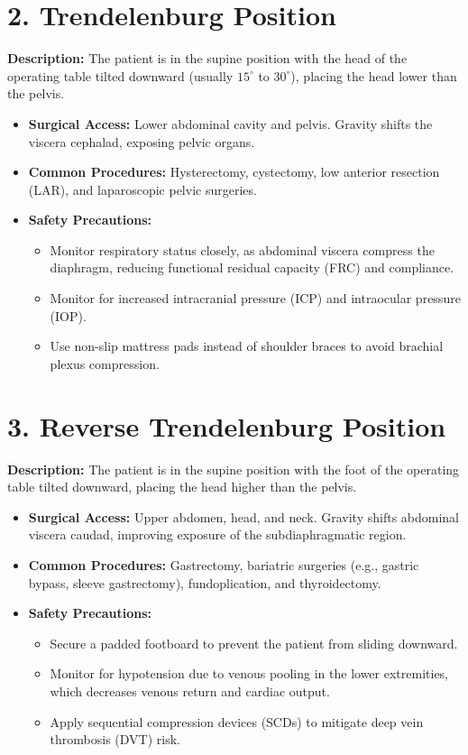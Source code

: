 \section*{2. Trendelenburg Position}
\textbf{Description:} The patient is in the supine position with the head of the operating table tilted downward (usually $15^{\circ}$ to $30^{\circ}$), placing the head lower than the pelvis.
\begin{itemize}
  \item \textbf{Surgical Access:} Lower abdominal cavity and pelvis. Gravity shifts the viscera cephalad, exposing pelvic organs.
  \item \textbf{Common Procedures:} Hysterectomy, cystectomy, low anterior resection (LAR), and laparoscopic pelvic surgeries.
  \item \textbf{Safety Precautions:}
  \begin{itemize}
    \item Monitor respiratory status closely, as abdominal viscera compress the diaphragm, reducing functional residual capacity (FRC) and compliance.
    \item Monitor for increased intracranial pressure (ICP) and intraocular pressure (IOP).
    \item Use non-slip mattress pads instead of shoulder braces to avoid brachial plexus compression.
  \end{itemize}
\end{itemize}

\section*{3. Reverse Trendelenburg Position}
\textbf{Description:} The patient is in the supine position with the foot of the operating table tilted downward, placing the head higher than the pelvis.
\begin{itemize}
  \item \textbf{Surgical Access:} Upper abdomen, head, and neck. Gravity shifts abdominal viscera caudad, improving exposure of the subdiaphragmatic region.
  \item \textbf{Common Procedures:} Gastrectomy, bariatric surgeries (e.g., gastric bypass, sleeve gastrectomy), fundoplication, and thyroidectomy.
  \item \textbf{Safety Precautions:}
  \begin{itemize}
    \item Secure a padded footboard to prevent the patient from sliding downward.
    \item Monitor for hypotension due to venous pooling in the lower extremities, which decreases venous return and cardiac output.
    \item Apply sequential compression devices (SCDs) to mitigate deep vein thrombosis (DVT) risk.
  \end{itemize}
\end{itemize}

